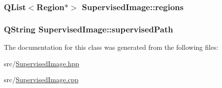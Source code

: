 \hypertarget{class_supervised_image_a264d8baa97fa79247b310a94e160e7fb}{
\subsubsection[{regions}]{\setlength{\rightskip}{0pt plus 5cm}Q\+List$<${\bf Region}$\ast$$>$ Supervised\+Image\+::regions\hspace{0.3cm}{\ttfamily [private]}}}\label{class_supervised_image_a264d8baa97fa79247b310a94e160e7fb}
\hypertarget{class_supervised_image_aeeb634f3804dffba600e6aea71fc353e}{
\subsubsection[{supervised\+Path}]{\setlength{\rightskip}{0pt plus 5cm}Q\+String Supervised\+Image\+::supervised\+Path\hspace{0.3cm}{\ttfamily [private]}}}\label{class_supervised_image_aeeb634f3804dffba600e6aea71fc353e}


The documentation for this class was generated from the following files\+:\begin{DoxyCompactItemize}
\item 
src/\hyperlink{_supervised_image_8hpp}{Supervised\+Image.\+hpp}\item 
src/\hyperlink{_supervised_image_8cpp}{Supervised\+Image.\+cpp}\end{DoxyCompactItemize}

